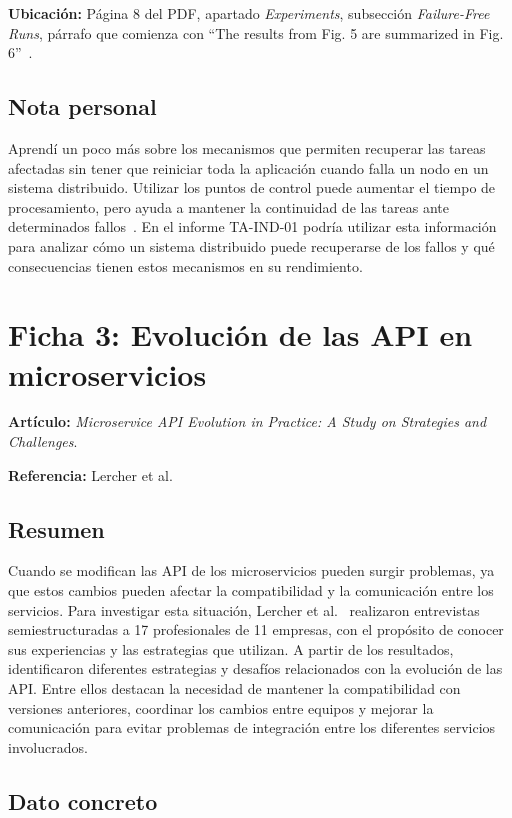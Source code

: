 \documentclass[12pt,a4paper]{article}
\begin{document}
\textbf{Ubicación:} Página 8 del PDF, apartado \textit{Experiments}, subsección \textit{Failure-Free Runs}, párrafo que comienza con ``The results from Fig. 5 are summarized in Fig. 6''~\cite{reitz2024}.

\subsection*{Nota personal}

Aprendí un poco más sobre los mecanismos que permiten recuperar las tareas afectadas sin tener que reiniciar toda la aplicación cuando falla un nodo en un sistema distribuido. Utilizar los puntos de control puede aumentar el tiempo de procesamiento, pero ayuda a mantener la continuidad de las tareas ante determinados fallos~\cite{reitz2024}. En el informe TA-IND-01 podría utilizar esta información para analizar cómo un sistema distribuido puede recuperarse de los fallos y qué consecuencias tienen estos mecanismos en su rendimiento.

\section*{Ficha 3: Evolución de las API en microservicios}

\noindent\textbf{Artículo:} \textit{Microservice API Evolution in Practice: A Study on Strategies and Challenges}.

\noindent\textbf{Referencia:} Lercher et al.~\cite{lercher2024}

\subsection*{Resumen}

Cuando se modifican las API de los microservicios pueden surgir problemas, ya que estos cambios pueden afectar la compatibilidad y la comunicación entre los servicios. Para investigar esta situación, Lercher et al.~\cite{lercher2024} realizaron entrevistas semiestructuradas a 17 profesionales de 11 empresas, con el propósito de conocer sus experiencias y las estrategias que utilizan. A partir de los resultados, identificaron diferentes estrategias y desafíos relacionados con la evolución de las API. Entre ellos destacan la necesidad de mantener la compatibilidad con versiones anteriores, coordinar los cambios entre equipos y mejorar la comunicación para evitar problemas de integración entre los diferentes servicios involucrados.

\subsection*{Dato concreto}
\end{document}
